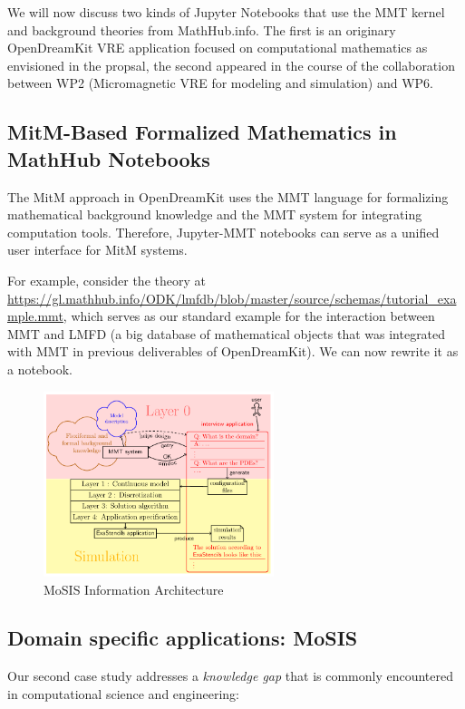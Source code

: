 We will now discuss two kinds of Jupyter Notebooks that use the MMT kernel and background theories from MathHub.info.
The first is an originary OpenDreamKit VRE application focused on computational mathematics as envisioned in the propsal, the second appeared in the course of the collaboration between WP2 (Micromagnetic VRE for modeling and simulation) and WP6. 

\subsection{MitM-Based Formalized Mathematics in MathHub Notebooks}

The MitM approach in  OpenDreamKit uses the MMT language for formalizing mathematical background knowledge and the MMT system for integrating computation tools.
Therefore, Jupyter-MMT notebooks can serve as a unified user interface for MitM systems.


For example, consider the theory at \url{https://gl.mathhub.info/ODK/lmfdb/blob/master/source/schemas/tutorial_example.mmt}, which serves as our standard example for the interaction between MMT and LMFD (a big database of mathematical objects that was integrated with MMT in previous deliverables of OpenDreamKit).
We can now rewrite it as a notebook.

\begin{figure}[ht]\centering
  \includegraphics[width=0.6\textwidth]{proto}
  \caption{MoSIS Information Architecture}\label{fig:prototype}
\end{figure}

\subsection{Domain specific applications: MoSIS}

Our second case study addresses a \emph{knowledge gap} that is commonly encountered in computational science and engineering:

